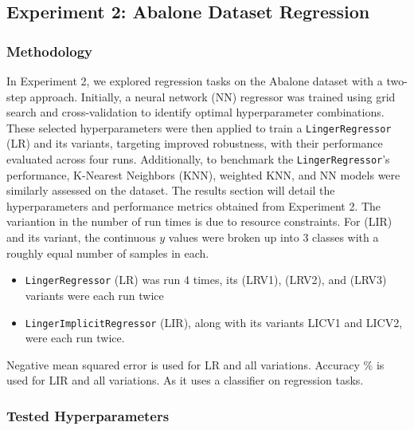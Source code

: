 \documentclass[a4paper, 12pt]{report}
\begin{document}
\subsection{Experiment 2: Abalone Dataset Regression}
\subsubsection{Methodology}
\label{exp:2Abalone}
In Experiment 2, we explored regression tasks on the Abalone dataset with a two-step approach. 
Initially, a neural network (NN) regressor was trained using grid search and cross-validation to identify optimal hyperparameter combinations. 
These selected hyperparameters were then applied to train a \texttt{LingerRegressor} (LR) and its variants, targeting improved robustness, 
with their performance evaluated across four runs. Additionally, to benchmark the \texttt{LingerRegressor}'s performance, K-Nearest Neighbors (KNN), 
weighted KNN, and NN models were similarly assessed on the dataset. The results section will detail the hyperparameters and performance metrics obtained from Experiment 2.
The variantion in the number of run times is due to resource constraints. 
For (LIR) and its variant, the continuous $y$ values were broken up into 3 classes with a roughly equal number of samples in each.
\begin{itemize}
    \item \texttt{LingerRegressor} (LR) was run 4 times, its (LRV1), (LRV2), and (LRV3) variants were each run twice
    \item \texttt{LingerImplicitRegressor} (LIR), along with its variants LICV1 and LICV2, were each run twice.
\end{itemize}

Negative mean squared error is used for LR and all variations.
Accuracy $\%$ is used for LIR and all variations. As it uses a classifier on regression tasks.
\subsubsection{Tested Hyperparameters}
\end{document}
